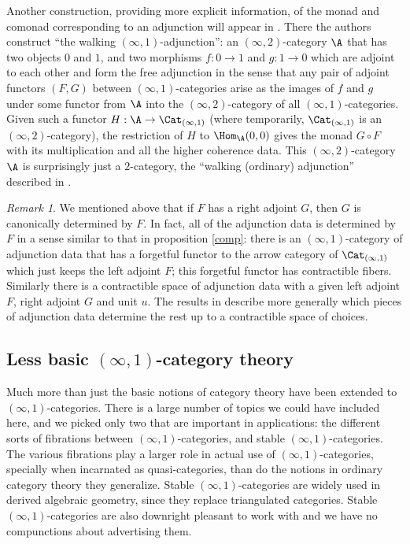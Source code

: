 \documentclass{conm-p-l}
\theoremstyle{definition} \newtheorem{definition}[theorem]{Definition}
\theoremstyle{remark} \newtheorem{remark}[theorem]{Remark}
\numberwithin{equation}{section}
\newcommand{\oo}{\infty}
\newcommand{\io}{$(\oo,1)$}
\newcommand{\Catio}{\Cat_{(\oo,1)}}
\begin{document}
Another construction, providing more explicit information, of the
monad and comonad corresponding to an adjunction will appear in
\cite{Adjunctions}. There the authors construct ``the walking
\io-adjunction'': an $(\oo,2)$-category $\A$ that has two objects $0$
and $1$, and two morphisms $f : 0 \to 1$ and $g:1 \to 0$ which are
adjoint to each other and form the free adjunction in the sense that
any pair of adjoint functors $(F,G)$ between \io-categories arise as
the images of $f$ and $g$ under some functor from $\A$ into the
$(\oo,2)$-category of all \io-categories. Given such a functor $H : \A
\to \Catio$ (where temporarily, $\Catio$ is an $(\oo,2)$-category),
the restriction of $H$ to $\Hom_\A(0,0)$ gives the monad $G \circ F$
with its multiplication and all the higher coherence data. This
$(\oo,2)$-category $\A$ is surprisingly just a $2$-category, the
``walking (ordinary) adjunction'' described in \cite{FreeAdj}.

\begin{remark}
  We mentioned above that if $F$ has a right adjoint $G$, then $G$ is
  canonically determined by $F$. In fact, all of the adjunction data
  is determined by $F$ in a sense similar to that in proposition
  \ref{comp}: there is an \io-category of adjunction data that has a
  forgetful functor to the arrow category of $\Catio$ which just keeps
  the left adjoint $F$; this forgetful functor has contractible
  fibers.  Similarly there is a contractible space of adjunction data
  with a given left adjoint $F$, right adjoint $G$ and unit $u$. The
  results in \cite{Adjunctions} describe more generally which pieces
  of adjunction data determine the rest up to a contractible space of
  choices.
\end{remark}

\subsection{Less basic \io-category theory}

Much more than just the basic notions of category theory have been
extended to \io-categories. There is a large number of topics we could
have included here, and we picked only two that are important in
applications: the different sorts of fibrations between
\io-categories, and stable \io-categories. The various fibrations play
a larger role in actual use of \io-categories, specially when
incarnated as quasi-categories, than do the notions in ordinary
category theory they generalize. Stable \io-categories are widely used
in derived algebraic geometry, since they replace triangulated
categories. Stable \io-categories are also downright pleasant to work
with and we have no compunctions about advertising them.
\end{document}
